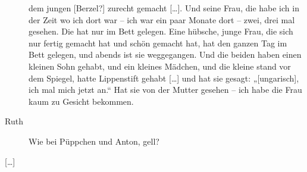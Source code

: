 \documentclass[ngerman,]{article}
\begin{document}
\begin{multicols}{2}
\begin{description}
dem jungen {[}Berzel?{]} zurecht gemacht {[}\ldots{}{]}. Und seine Frau,
die habe ich in der Zeit wo ich dort war – ich war ein paar Monate dort
– zwei, drei mal gesehen. Die hat nur im Bett gelegen. Eine hübsche,
junge Frau, die sich nur fertig gemacht hat und schön gemacht hat, hat
den ganzen Tag im Bett gelegen, und abends ist sie weggegangen. Und die
beiden haben einen kleinen Sohn gehabt, und ein kleines Mädchen, und die
kleine stand vor dem Spiegel, hatte Lippenstift gehabt {[}\ldots{}{]}
und hat sie gesagt: „{[}ungarisch{]}, ich mal mich jetzt an.“ Hat sie
von der Mutter gesehen – ich habe die Frau kaum zu Gesicht bekommen.
\item[Ruth]
Wie bei Püppchen und Anton, gell?
\end{description}

{[}\ldots{}{]}


\end{multicols}
\end{document}
